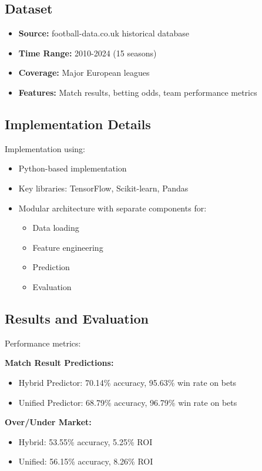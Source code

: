 \documentclass[conference]{IEEEtran}
\begin{document}
\subsection{Dataset}
\begin{itemize}
    \item \textbf{Source:} football-data.co.uk historical database
    \item \textbf{Time Range:} 2010-2024 (15 seasons)
    \item \textbf{Coverage:} Major European leagues
    \item \textbf{Features:} Match results, betting odds, team performance metrics
\end{itemize}

\subsection{Implementation Details}
Implementation using:
\begin{itemize}
    \item Python-based implementation
    \item Key libraries: TensorFlow, Scikit-learn, Pandas
    \item Modular architecture with separate components for:
    \begin{itemize}
        \item Data loading
        \item Feature engineering
        \item Prediction
        \item Evaluation
    \end{itemize}
\end{itemize}

\subsection{Results and Evaluation}
Performance metrics:

\textbf{Match Result Predictions:}
\begin{itemize}
    \item Hybrid Predictor: 70.14\% accuracy, 95.63\% win rate on bets
    \item Unified Predictor: 68.79\% accuracy, 96.79\% win rate on bets
\end{itemize}

\textbf{Over/Under Market:}
\begin{itemize}
    \item Hybrid: 53.55\% accuracy, 5.25\% ROI
    \item Unified: 56.15\% accuracy, 8.26\% ROI
\end{itemize}
\end{document}
